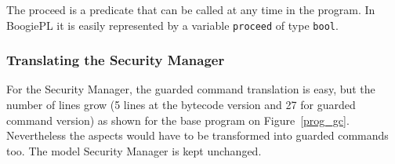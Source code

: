 The proceed is a predicate that can be called at any time in the program.
In BoogiePL it is easily represented by a variable {\tt proceed} 
of type {\tt bool}.

\subsubsection{Translating the Security Manager}
For the Security Manager, the guarded command translation is easy, but
the number of lines grow (5 lines at the bytecode version and 27 for
guarded command version) as shown for the base program on Figure~\ref{prog_gc}.
Nevertheless the aspects would have to be transformed into guarded
commands too. The model Security Manager is kept unchanged.




\vspace{-0.4cm}
